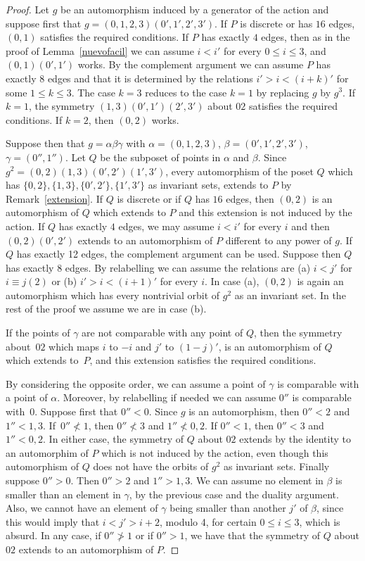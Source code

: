 \documentclass[10pt,a4paper]{amsart}
\theoremstyle{plain}
\theoremstyle{definition}
\theoremstyle{remark}
\begin{document}
\begin{proof}
Let $g$ be an automorphism induced by a generator of the action and suppose first that $g=(0,1,2,3)(0',1',2',3')$. If $P$ is discrete or has $16$ edges, $(0,1)$ satisfies the required conditions. If $P$ has exactly $4$ edges, then as in the proof of Lemma~\ref{nuevofacil} we can assume $i<i'$ for every $0\le i\le 3$, and $(0,1)(0',1')$ works. By the complement argument we can assume $P$ has exactly $8$ edges and that it is determined by the relations $i'>i<(i+k)'$ for some $1\le k\le 3$. The case $k=3$ reduces to the case $k=1$ by replacing $g$ by $g^3$. If $k=1$, the symmetry $(1,3)(0',1')(2',3')$ about $02$ satisfies the required conditions. If $k=2$, then $(0,2)$ works.

Suppose then that $g=\alpha \beta \gamma$ with $\alpha=(0,1,2,3)$, $\beta=(0',1',2',3')$, $\gamma=(0'',1'')$. Let $Q$ be the subposet of points in $\alpha$ and $\beta$. Since $g^2=(0,2)(1,3)(0',2')(1',3')$, every automorphism of the poset $Q$ which has $\{0,2\},\{1,3\}, \{0',2'\}, \{1',3'\}$ as invariant sets, extends to $P$ by Remark~\ref{extension}. If $Q$ is discrete or if $Q$ has $16$ edges, then $(0,2)$ is an automorphism of $Q$ which extends to $P$ and this extension is not induced by the action. If $Q$ has exactly $4$ edges, we may assume $i<i'$ for every $i$ and then $(0,2)(0',2')$ extends to an automorphism of $P$ different to any power of $g$. If $Q$ has exactly 12 edges, the complement argument can be used. Suppose then $Q$ has exactly $8$ edges. By relabelling we can assume the relations are (a) $i<j'$ for $i\equiv j (2)$ or (b) $i'>i<(i+1)'$ for every $i$. In case (a), $(0,2)$ is again an automorphism which has every nontrivial orbit of $g^2$ as an invariant set. In the rest of the proof we assume we are in case (b). 

If the points of $\gamma$ are not comparable with any point of $Q$, then the symmetry about~$02$ which maps $i$ to $-i$ and $j'$ to $(1-j)'$, is an automorphism of $Q$ which extends to~$P$, and this extension satisfies the required conditions.

By considering the opposite order, we can assume a point of $\gamma$ is comparable with a point of $\alpha$. Moreover, by relabelling if needed we can assume $0''$ is comparable with~$0$. Suppose first that $0''<0$. Since $g$ is an automorphism, then $0''<2$ and $1''<1,3$. If~$0''\nless 1$, then $0''\nless 3$ and $1''\nless 0,2$. If $0''<1$, then $0''<3$ and $1''<0,2$. In either case, the symmetry of $Q$ about $02$ extends by the identity to an automorphim of $P$ which is not induced by the action, even though this automorphism of $Q$ does not have the orbits of $g^2$ as invariant sets. Finally suppose $0''>0$. Then $0''>2$ and $1''>1,3$. We can assume no element in $\beta$ is smaller than an element in $\gamma$, by the previous case and the duality argument. Also, we cannot have an element of $\gamma$ being smaller than another $j'$ of $\beta$, since this would imply that $i<j'>i+2$, modulo 4, for certain $0\le i\le 3$, which is absurd. In any case, if $0''\ngtr 1$ or if $0''>1$, we have that the symmetry of $Q$ about $02$ extends to an automorphism of $P$. 
\end{proof}
\end{document}
